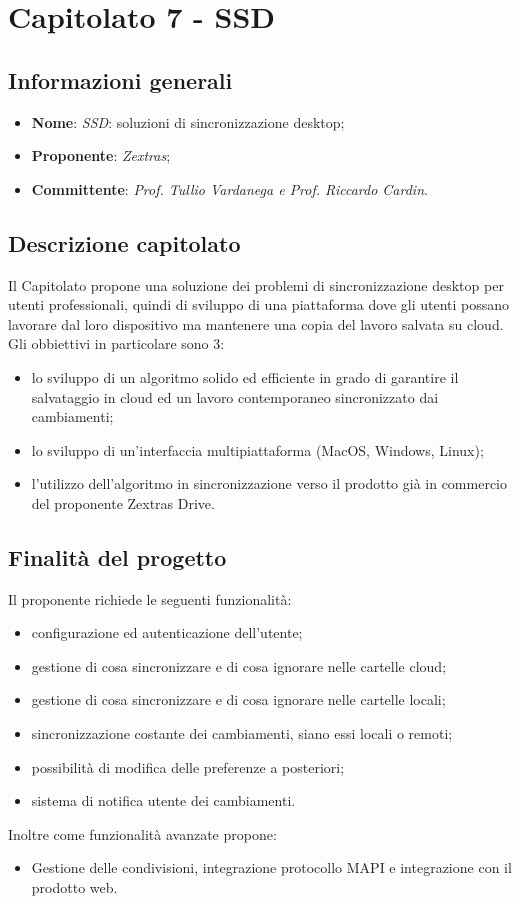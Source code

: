 \section{Capitolato 7 - SSD}
\subsection{Informazioni generali}
\begin{itemize}
    \item \textbf{Nome}: \emph{SSD}: soluzioni di sincronizzazione desktop;
    \item \textbf{Proponente}: \emph{Zextras};
    \item \textbf{Committente}: \emph{Prof. Tullio Vardanega e Prof. Riccardo Cardin}.
\end{itemize}
\subsection{Descrizione capitolato}
Il Capitolato propone una soluzione dei problemi di sincronizzazione desktop per utenti professionali, quindi di sviluppo di una piattaforma dove gli utenti possano lavorare dal loro dispositivo ma mantenere una copia del lavoro salvata su cloud.
Gli obbiettivi in particolare sono 3:
\begin{itemize}
    \item lo sviluppo di un algoritmo solido ed efficiente in grado di garantire il salvataggio in cloud ed un lavoro contemporaneo sincronizzato dai cambiamenti;
    \item lo sviluppo di un'interfaccia multipiattaforma (MacOS, Windows, Linux);
    \item l'utilizzo dell'algoritmo in sincronizzazione verso il prodotto già in commercio del proponente Zextras Drive.
\end{itemize}
\subsection{Finalità del progetto}
Il proponente richiede le seguenti funzionalità:
\begin{itemize}
    \item configurazione ed autenticazione dell'utente;
    \item gestione di cosa sincronizzare e di cosa ignorare nelle cartelle cloud;
    \item gestione di cosa sincronizzare e di cosa ignorare nelle cartelle locali;
    \item sincronizzazione costante dei cambiamenti, siano essi locali o remoti;
    \item possibilità di modifica delle preferenze a posteriori;
    \item sistema di notifica utente dei cambiamenti.
\end{itemize}
Inoltre come funzionalità avanzate propone:
\begin{itemize}
    \item Gestione delle condivisioni, integrazione protocollo MAPI e integrazione con il prodotto web.
\end{itemize}
